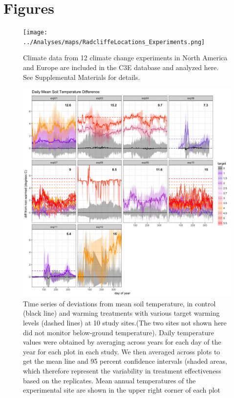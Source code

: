 \documentclass{article}
\begin{document}
\section* {Figures}

\begin{figure}[p]
\centering
\texttt{[image: ../Analyses/maps/RadcliffeLocations\_Experiments.png]} 
\caption{Climate data from 12 climate change experiments in North America and Europe are included in the C3E database and analyzed here. See Supplemental Materials for details.} 
 \label{fig:map}
 \end{figure}
\clearpage
\begin{figure}[h]
\centering
 \includegraphics{../Analyses/figures/Exploratory_TimeSeries_SoilTemp1Mean_Deviation.png}
 \caption{Time series of deviations from mean soil temperature, in control (black line)
and warming treatments with various target warming levels (dashed lines) at 10 study sites.(The two sites not shown here did not monitor below-ground temperature). Daily temperature values were obtained by averaging across years for each day of the year for each plot in each study. We then averaged across plots to get the mean line and 95 percent confidence intervals (shaded areas, which therefore represent the variability in treatment effectiveness based on the replicates. Mean annual temperatures of the experimental site are shown in the upper right corner of each plot }
 \label{fig:effwarm}

 \end{figure}
\end{document}
